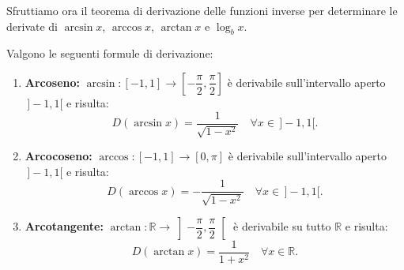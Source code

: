 Sfruttiamo ora il teorema di derivazione delle funzioni inverse per determinare le derivate di $\arcsin x$, $\arccos x$, $\arctan x$ e $\log_b x$.

\begin{propbox}
Valgono le seguenti formule di derivazione:
\begin{enumerate}
    \item \textbf{Arcoseno:} $\arcsin \colon [-1, 1] \to \left[-\dfrac{\pi}{2}, \dfrac{\pi}{2}\right]$ è derivabile sull'intervallo aperto $\,]-1, 1[$ e risulta:
    \[
        D(\arcsin x) = \frac{1}{\sqrt{1 - x^2}} \quad \forall x \in \,]-1, 1[.
    \]
    \item \textbf{Arcocoseno:} $\arccos \colon [-1, 1] \to [0, \pi]$ è derivabile sull'intervallo aperto $\,]-1, 1[$ e risulta:
    \[
        D(\arccos x) = -\frac{1}{\sqrt{1 - x^2}} \quad \forall x \in \,]-1, 1[.
    \]
    \item \textbf{Arcotangente:} $\arctan \colon \mathbb{R} \to \left]-\dfrac{\pi}{2}, \dfrac{\pi}{2}\right[$ è derivabile su tutto $\mathbb{R}$ e risulta:
    \[
        D(\arctan x) = \frac{1}{1 + x^2} \quad \forall x \in \mathbb{R}.
    \]
\end{enumerate}
\end{propbox}

